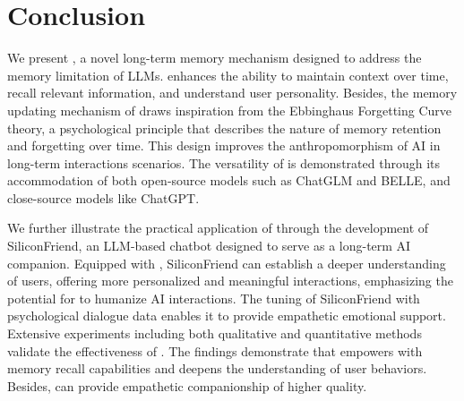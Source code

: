 
\saveSpaceSec
\section{Conclusion}
\saveSpaceSec
We present \method, a novel long-term memory mechanism designed to address the memory limitation of LLMs. 
\method enhances the ability to maintain context over time, recall relevant information, and understand user personality. 
Besides, the memory updating mechanism of \method draws inspiration from the Ebbinghaus Forgetting Curve theory, a psychological principle that describes the nature of memory retention and forgetting over time. 
This design improves the anthropomorphism of AI in long-term interactions scenarios. The versatility of \method is demonstrated through its accommodation of both open-source models such as ChatGLM and BELLE, and close-source models like ChatGPT. 

We further illustrate the practical application of \method through the development of SiliconFriend, an LLM-based chatbot designed to serve as a long-term AI companion. Equipped with \method, SiliconFriend can establish a deeper understanding of users, offering more personalized and meaningful interactions, emphasizing the potential for \method to humanize AI interactions. The tuning of SiliconFriend with psychological dialogue data enables it to provide empathetic emotional support. Extensive experiments including both qualitative and quantitative methods validate the effectiveness of \method. The findings demonstrate that \method empowers \chatbot with memory recall capabilities and deepens the understanding of user behaviors. Besides, \chatbot can provide empathetic companionship of higher quality.


